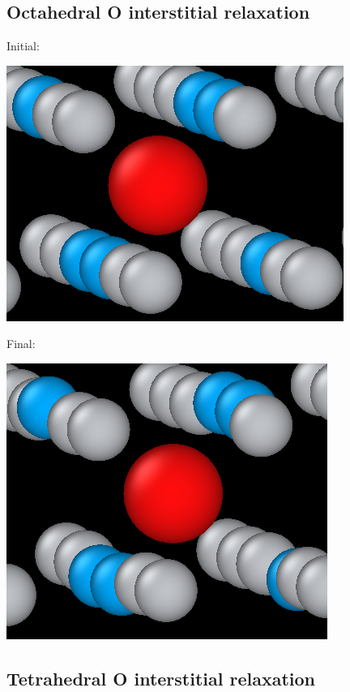 \documentclass[11pt]{article}
\begin{document}
\subsection{Octahedral O interstitial relaxation}
\label{sec:orge0d2230}

Initial:
\begin{center}
\includegraphics[width=.9\linewidth]{Images/initial_octahedral_ox_ovito.png}
\end{center}

Final:
\begin{center}
\includegraphics[width=.9\linewidth]{Images/final_octahedral_ox_ovito.png}
\end{center}

\subsection{Tetrahedral O interstitial relaxation}
\label{sec:orgb307b87}
\end{document}

